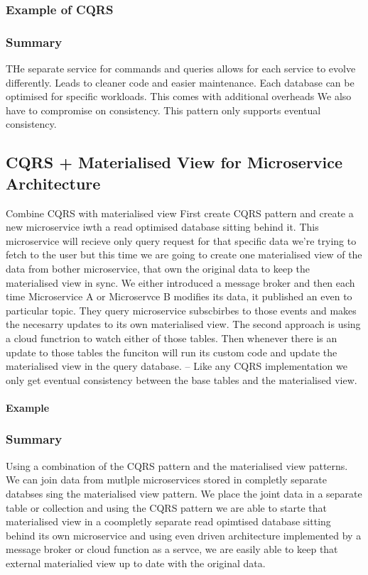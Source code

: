 \documentclass[a4paper, 11pt]{book}
\begin{document}
{    \subsubsection{Example of CQRS}

    \subsubsection{Summary}
    THe separate service for commands and queries allows for each service to evolve differently.
    Leads to cleaner code and easier maintenance.
    Each database can be optimised for specific workloads.
    This comes with additional overheads
    We also have to compromise on consistency.
    This pattern only supports eventual consistency.

    \subsection{CQRS + Materialised View for Microservice Architecture}
    Combine CQRS with materialised view
    First create CQRS pattern and create a new microservice iwth a read optimised database sitting behind it.
    This microservice will recieve only query request for that specific data we're trying to fetch to the user but this time we are going to create one materialised view of the data from bother microservice, that own the original data to keep the materialised view in sync.
    We either introduced a message broker and then each time Microservice A or Microservce B modifies its data, it published an even to particular topic.
    They query microservice subscbirbes to those events and makes the necesarry updates to its own materialised view.
    The second approach is using a cloud functrion to watch either of those tables.
    Then whenever there is an update to those tables the funciton will run its custom code and update the materialised view in the query database.
    -- Like any CQRS implementation we only get eventual consistency between the base tables and the materialised view.

    \paragraph{Example}

    \subsubsection{Summary}
    Using a combination of the CQRS pattern and the materialised view patterns.
    We can join data from mutlple microservices stored in completly separate databses sing the materialised view pattern.
    We place the joint data in a separate table or collection and using the CQRS pattern we are able to starte that materialised view in a coompletly separate read opimtised database sitting behind its own microservice and using even driven architecture implemented by a message broker or cloud function as a servce, we are easily able to keep that external materialied view up to date with the original data.

}
\end{document}
